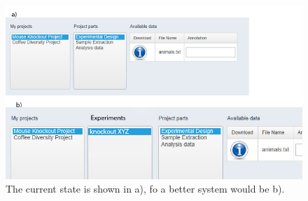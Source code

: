 \documentclass[a4paper, 11pt]{article}
\begin{document}
\begin{figure}[h]
	\includegraphics[scale=2.0]{better-System.png}
	\caption{The current state is shown in a), fo a better system would be b).}
	\label{fig:better-system}
\end{figure}



\clearpage

\end{document}
